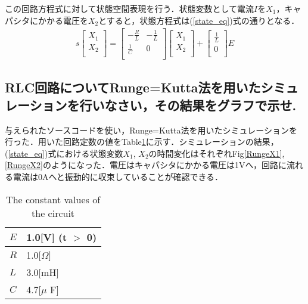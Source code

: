 \documentclass[a4paper,10pt,twocolumn,fleqn]{jarticle}
\begin{document}
    この回路方程式に対して状態空間表現を行う．状態変数として電流$I$を$X_1$，キャパシタにかかる電圧を$X_2$とすると，状態方程式は(\ref{state_eq})式の通りとなる．
    \begin{eqnarray}
      \label{state_eq}
        s
        \left[
          \begin{array}{c}
            X_1 \\
            X_2 \\
          \end{array}
        \right]
        =
        \left[
          \begin{array}{cc}
            -\frac{R}{L} & -\frac{1}{L} \\
            \frac{1}{C} & 0 \\
          \end{array}
        \right]
        \left[
          \begin{array}{c}
            X_1 \\
            X_2 \\
          \end{array}
        \right]
        +
        \left[
          \begin{array}{c}
            \frac{1}{L} \\
            0 \\
          \end{array}
        \right]
        E
    \end{eqnarray}

  \subsection{RLC回路についてRunge=Kutta法を用いたシミュレーションを行いなさい，その結果をグラフで示せ.}

  与えられたソースコードを使い，Runge=Kutta法を用いたシミュレーションを行った．用いた回路定数の値をTable\ref{values}に示す．シミュレーションの結果，(\ref{state_eq})式における状態変数$X_1$, $X_2$の時間変化はそれぞれFig\ref{RungeX1}, \ref{RungeX2}のようになった．電圧はキャパシタにかかる電圧は1Vへ，回路に流れる電流は0Aへと振動的に収束していることが確認できる．

  \begin{table}[htp]
    \centering
    \caption{The constant values of the circuit}
    \label{values}
    \begin{tabular}{|l|l|}
      \hline
      $E$ & 1.0[V] (t $>$ 0)\\ \hline
      $R$ & 1.0[$\Omega$]  \\ \hline
      $L$ & 3.0[mH] \\ \hline
      $C$ & 4.7[$\mu$ F]  \\ \hline
    \end{tabular}
  \end{table}
\end{document}
